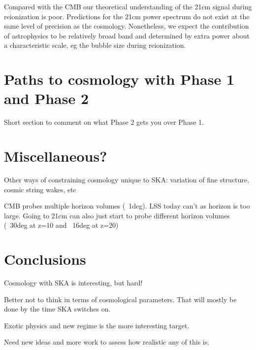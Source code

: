 \documentclass{PoS}
\begin{document}
Compared with the CMB our theoretical understanding of the 21cm signal during reionization is poor. Predictions for the 21cm power spectrum do not exist at the same level of precision as the cosmology. Nonetheless, we expect the contribution of astrophysics to be relatively broad band and determined by extra power about a characteristic scale, eg the bubble size during reionization.

\section{Paths to cosmology with Phase 1 and Phase 2}

Short section to comment on what Phase 2 gets you over Phase 1.

\section{Miscellaneous?}

Other ways of constraining cosmology unique to SKA: variation of fine structure, cosmic string wakes, etc

CMB probes multiple horizon volumes (~1deg). LSS today can't as horizon is too large. Going to 21cm can also just start to probe different horizon volumes (~30deg at z=10 and ~16deg at z=20)

\section{Conclusions}

Cosmology with SKA is interesting, but hard!

Better not to think in terms of cosmological parameters. That will mostly be done by the time SKA switches on.

Exotic physics and new regime is the more interesting target.

Need new ideas and more work to assess how realistic any of this is.





\end{document}

